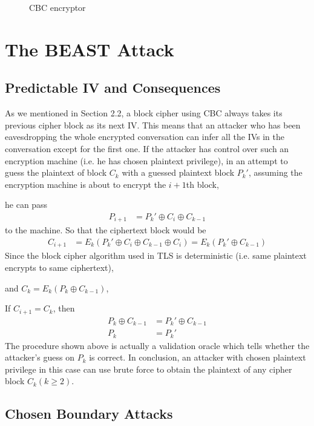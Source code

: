 \documentclass{acm_proc_article-sp}
\begin{document}
\begin{figure}[htb]
  \centering
  
  \caption{CBC encryptor}
\end{figure}

\section{The BEAST Attack}
\subsection{Predictable IV and Consequences}
As we mentioned in Section 2.2, a block cipher using CBC always takes its previous cipher block as
its next IV. This means that an attacker who has been eavesdropping the whole encrypted
conversation can infer all the IVs in the conversation except for the first one.
If the attacker has control over such an encryption machine (i.e. he has chosen plaintext privilege),
in an attempt to guess the plaintext of block $C_k$ with a guessed plaintext block $P_k'$,
assuming the encryption machine is about to encrypt the $i+1$th block,

he can pass
$$
\begin{aligned}
P_{i+1}&=P_k'\oplus C_i\oplus C_{k-1}
\end{aligned}
$$
to the machine. So that the ciphertext block would be
$$
\begin{aligned}
C_{i+1}&=E_k(P_k'\oplus C_i\oplus C_{k-1}\oplus C_i)=E_k(P_k'\oplus C_{k-1})
\end{aligned}
$$
Since the block cipher algorithm used in TLS is deterministic
(i.e. same plaintext encrypts to same ciphertext),

and $C_k = E_k(P_k\oplus C_{k-1})$,

If $C_{i+1} = C_k$, then
$$
\begin{aligned}
P_k\oplus C_{k-1}&= P_k'\oplus C_{k-1}\\
P_k&= P_k'
\end{aligned}
$$
The procedure shown above is actually a validation oracle which tells whether the attacker's guess
on $P_k$ is correct. In conclusion, an attacker with chosen plaintext privilege in this case can use
brute force to obtain the plaintext of any cipher block $C_k(k\geq 2)$.
\subsection{Chosen Boundary Attacks}
\end{document}
